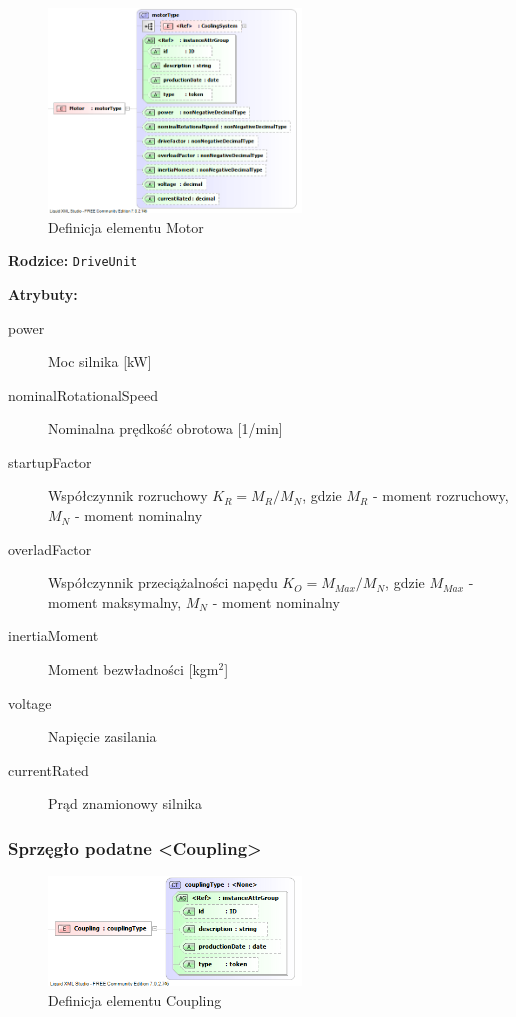 \documentclass[12pt,a4paper]{article}
\begin{document}
\begin{figure}[H]
  \centering
  \includegraphics[width=0.6\textwidth]{png/liquid/Motor}
  \caption{Definicja elementu Motor}
  \label{fig:motor-xsd}
\end{figure}

\noindent\textbf{Rodzice:} \texttt{DriveUnit}

\noindent\textbf{Atrybuty:}
\begin{description}
\item[power] Moc silnika [kW]
\item[nominalRotationalSpeed] Nominalna prędkość obrotowa [1/min]
\item[startupFactor] Współczynnik rozruchowy $K_R = M_R/M_N$,
	gdzie $M_R$ - moment rozruchowy, $M_N$ - moment nominalny
\item[overladFactor] Współczynnik przeciążalności napędu $K_O = M_{Max}/M_N$,
	gdzie $M_{Max}$ - moment maksymalny, $M_N$ - moment nominalny
\item[inertiaMoment] Moment bezwładności [kgm$^2$]
\item[voltage] Napięcie zasilania
\item[currentRated] Prąd znamionowy silnika
\end{description}

\subsubsection{Sprzęgło podatne <Coupling>}

\begin{figure}[H]
  \centering
  \includegraphics[width=0.6\textwidth]{png/liquid/Coupling}
  \caption{Definicja elementu Coupling}
  \label{fig:coupling-xsd}
\end{figure}
\end{document}
